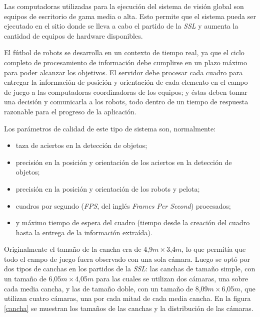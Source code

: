 Las computadoras utilizadas para la ejecución del sistema de visión global son
equipos de escritorio de gama media o alta. Esto permite que el sistema pueda
ser ejecutado en el sitio donde se lleva a cabo el partido de la \emph{SSL} y
aumenta la cantidad de equipos de hardware disponibles.

El fútbol de robots se desarrolla en un contexto de tiempo real, ya que el
ciclo completo de procesamiento de información debe cumplirse en un plazo
máximo para poder alcanzar los objetivos. El servidor debe procesar cada
cuadro para entregar la información de posición y orientación de cada elemento
en el campo de juego a las computadoras coordinadoras de los equipos; y éstas
deben tomar una decisión y comunicarla a los robots, todo dentro de un tiempo
de respuesta razonable para el progreso de la aplicación.

Los parámetros de calidad de este tipo de sistema son, normalmente:

\begin{itemize}

	\item 	taza de aciertos en la detección de objetos;

	\item 	precisión en la posición y orientación de los aciertos en la
		detección de objetos;

	\item 	precisión en la posición y orientación de los robots y pelota;

	\item 	cuadros por segundo (\emph{FPS}, del inglés \emph{Frames Per
		Second}) procesados;

	\item 	y máximo tiempo de espera del cuadro (tiempo desde la creación
		del cuadro hasta la entrega de la información extraída).

\end{itemize}

Originalmente el tamaño de la cancha era de 4,9$m\times$3,4$m$, lo que permitía
que todo el campo de juego fuera observado con una sola cámara. Luego se optó
por dos tipos de canchas en los partidos de la \emph{SSL}: las canchas de tamaño
simple, con un tamaño de 6,05$m\times$4,05$m$ para las cuales se utilizan dos
cámaras, una sobre cada media cancha, y las de tamaño doble, con un tamaño de
8,09$m\times$6,05$m$, que utilizan cuatro cámaras, una por cada mitad de cada
media cancha. En la figura \ref{cancha} se muestran los tamaños de las canchas y
la distribución de las cámaras.


